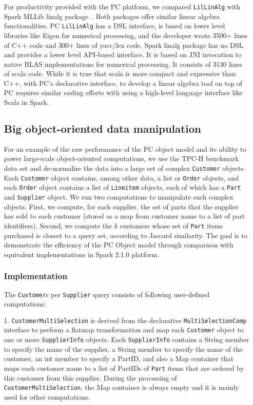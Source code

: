 For productivity provided with the PC platform, we compared
\texttt{LilLinAlg} with Spark MLLib linalg
package~\cite{bosagh2016matrix}. Both packages offer similar linear algebra
functionalities. PC \texttt{LilLinAlg} has a DSL interface, is based on lower level
libraries like Eigen for numerical processing, and the developer 
wrote 3500+
lines of C++ code and 300+ lines of yacc/lex code. Spark linalg
package has no DSL and provides a lower level API-based interface. It
is based on JNI invocation to native BLAS implementations for
numerical processing. It consists of 3130 lines of scala
code. While it is true that scala is more compact and expressive
than C++, with PC's declarative interface, to develop a linear algebra
tool on top of PC requires similar coding efforts with using a
high-level language interface like Scala in Spark.



\subsection{Big object-oriented data manipulation}
For an example of the raw performance of the PC object model and its ability to power large-scale 
object-oriented computations, we use the TPC-H benchmark data set \cite{council2008tpc}
and de-normalize
the data into a large set of complex \texttt{Customer} objects. Each
\texttt{Customer} object contains, among
other data, a list
or \texttt{Order} objects, and each \texttt{Order} object contains a list of \texttt{Lineitem} objects,
each of which has a \texttt{Part} and \texttt{Supplier} object.  
We run two computations to manipulate such complex objects. First, we compute, for each supplier,
the set of parts that the supplier has sold to each customer (stored
as a map from customer name to a list of part identifiers).
Second, we compute the $k$ customers whose set of \texttt{Part} items purchased is closest to
a query set, according to Jaccard similarity.
The goal is to demonstrate the efficiency of the PC
Object model through comparison with equivalent implementations in Spark 2.1.0 platform.

\subsubsection{Implementation}
The \texttt{Customer}s per \texttt{Supplier} query consists of
following user-defined computations:  

\vspace{5pt}
1. \texttt{CustomerMultiSelection} is derived from the
declarative \texttt{MultiSelectionComp} interface to perform a flatmap
transformation and map each \texttt{Customer} object to one or more
\texttt{SupplierInfo} objects. Each \texttt{SupplierInfo} contains a
String member to specify the name of the supplier, a String member to
specify the name of the customer, an int member to specify a PartID, and
also a Map container that maps each customer name to a list of PartIDs
of \texttt{Part} items that are
ordered by this customer from this supplier. During the processing of
\texttt{CustomerMultiSelection}, the Map container is always empty and
it is mainly used for other computations.

